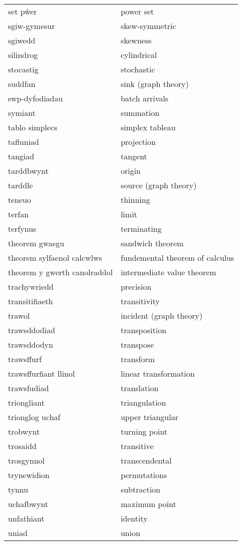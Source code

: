 \begin{supertabular}{p{0.22\textwidth}p{0.22\textwidth}}
set pŵer & power set \\
sgiw-gymesur & skew-symmetric \\
sgiwedd & skewness \\
silindrog & cylindrical \\
stocastig & stochastic \\
suddfan & sink (graph theory) \\
swp-dyfodiadau & batch arrivals \\
symiant & summation \\
tablo simplecs & simplex tableau \\
tafluniad & projection \\
tangiad & tangent \\
tarddbwynt & origin \\
tarddle & source (graph theory) \\
teneuo & thinning \\
terfan & limit \\
terfynus & terminating \\
theorem gwasgu & sandwich theorem \\
theorem sylfaenol calcwlws & fundemental theorem of calculus \\
theorem y gwerth canolraddol & intermediate value theorem \\
trachywriedd & precision \\
transitifiaeth & transitivity \\
trawol & incident (graph theory) \\
trawsddodiad & transposition \\
trawsddodyn & transpose \\
trawsffurf & transform \\
trawsffurfiant llinol & linear transformation \\
trawsfudiad & translation \\
triongliant & triangulation \\
trionglog uchaf & upper triangular \\
trobwynt & turning point \\
trosaidd & transitive \\
trosgynnol & transcendental \\
trynewidion & permutations \\
tynnu & subtraction \\
uchafbwynt & maximum point \\
unfathiant & identity \\
uniad & union \\

\end{supertabular}
